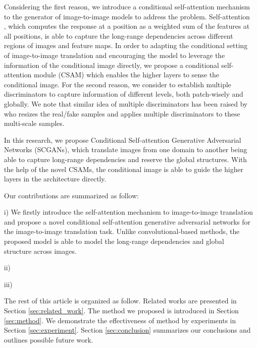 Considering the first reason, we introduce a conditional self-attention mechanism to the generator of image-to-image models to address the problem.
Self-attention \cite{Non-local, Attention, MachineReading, SAGANs}, which computes the response at a position as a weighted sum of the features at all positions, is able to capture the long-range dependencies across different regions of images and feature maps. In order to adapting the conditional setting of image-to-image translation and encouraging the model to leverage the information of the conditional image directly, we propose a conditional self-attention module (CSAM) which enables the higher layers to sense the conditional image. 
%
For the second reason, we consider to establish multiple discriminators to capture information of different levels, both patch-wisely and globally. We note that similar idea of multiple discriminators has been raised by \cite{LaplaceGANs, SGANs, StackGANs, CRN} who resizes the real/fake samples and applies multiple discriminators to these multi-scale samples. 

In this research, we propose Conditional Self-attention Generative Adversarial Networks (SCGANs), which translate images from one domain to another being able to capture long-range dependencies and reserve the global structures. With the help of the novel CSAMs, the conditional image is able to guide the higher layers in the architecture directly.  

Our contributions are summarized as follow:

i) We firstly introduce the self-attention mechanism to image-to-image translation and propose a novel conditional self-attention generative adversarial networks for the image-to-image translation task. Unlike convolutional-based methods, the proposed model is able to model the long-range dependencies and global structure across images.

ii)

iii)

The rest of this article is organized as follow. Related works are presented in Section \ref{sec:related_work}. The method we proposed is introduced in Section \ref{sec:method}. We demonstrate the effectiveness of method by experiments in Section \ref{sec:experiment}. Section \ref{sec:conclusion} summarizes our conclusions and outlines 
possible future work.